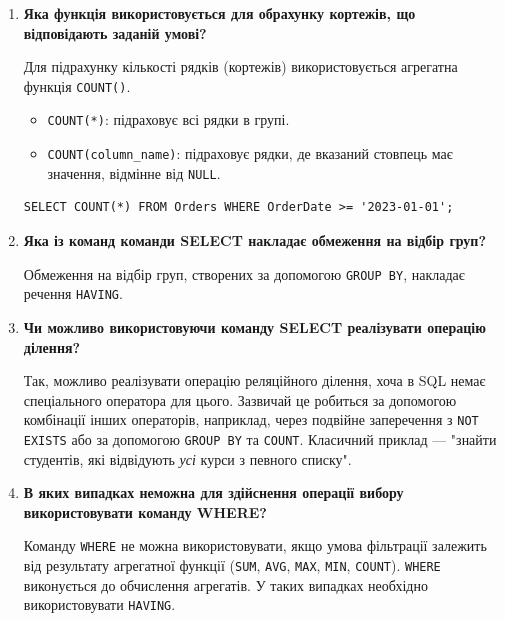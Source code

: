 \documentclass{article}
\begin{document}
\begin{enumerate}[label=\arabic*., leftmargin=*]
        \item \textbf{Яка функція використовується для обрахунку кортежів, що відповідають заданій умові?}
        
        Для підрахунку кількості рядків (кортежів) використовується агрегатна функція \texttt{COUNT()}.
        \begin{itemize}
            \item \texttt{COUNT(*)}: підраховує всі рядки в групі.
            \item \texttt{COUNT(column\_name)}: підраховує рядки, де вказаний стовпець має значення, відмінне від \texttt{NULL}.
        \end{itemize}
        \begin{CodeBox}
        \begin{verbatim}
SELECT COUNT(*) FROM Orders WHERE OrderDate >= '2023-01-01';
        \end{verbatim}
        \end{CodeBox}
        
        \item \textbf{Яка із команд команди SELECT накладає обмеження на відбір груп?}
        
        Обмеження на відбір груп, створених за допомогою \texttt{GROUP BY}, накладає речення \texttt{HAVING}.
        
        \item \textbf{Чи можливо використовуючи команду SELECT реалізувати операцію ділення?}
        
        Так, можливо реалізувати операцію реляційного ділення, хоча в SQL немає спеціального оператора для цього. Зазвичай це робиться за допомогою комбінації інших операторів, наприклад, через подвійне заперечення з \texttt{NOT EXISTS} або за допомогою \texttt{GROUP BY} та \texttt{COUNT}. Класичний приклад — "знайти студентів, які відвідують \textit{усі} курси з певного списку".
        
        \item \textbf{В яких випадках неможна для здійснення операції вибору використовувати команду WHERE?}
        
        Команду \texttt{WHERE} не можна використовувати, якщо умова фільтрації залежить від результату агрегатної функції (\texttt{SUM}, \texttt{AVG}, \texttt{MAX}, \texttt{MIN}, \texttt{COUNT}). \texttt{WHERE} виконується до обчислення агрегатів. У таких випадках необхідно використовувати \texttt{HAVING}.
        
    \end{enumerate}
\end{document}
